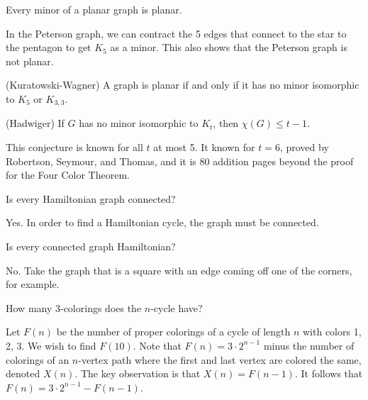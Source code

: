 \documentclass[a4paper]{article}
\begin{document}
\begin{observe}
	Every minor of a planar graph is planar.
\end{observe}

\begin{eg}
	In the Peterson graph, we can contract the 5 edges that connect to the star to the pentagon to get \( K_5 \) as a minor. This also shows that the Peterson graph is not planar.
\end{eg}

\begin{theorem}
	(Kuratowski-Wagner) A graph is planar if and only if it has no minor isomorphic to \( K_5 \) or \( K_{3,3} \).
\end{theorem}

\begin{conjecture}
	(Hadwiger) If \( G \) has no minor isomorphic to \( K_t \), then \( \chi(G) \le t-1 \).
\end{conjecture}

\begin{note}
	This conjecture is known for all \( t \) at most 5. It known for \( t=6 \), proved by Robertson, Seymour, and Thomas, and it is 80 addition pages beyond the proof for the Four Color Theorem.
\end{note}


\begin{eg}
	Is every Hamiltonian graph connected?
\end{eg}

Yes. In order to find a Hamiltonian cycle, the graph must be connected.

\begin{eg}
	Is every connected graph Hamiltonian?
\end{eg}

No. Take the graph that is a square with an edge coming off one of the corners, for example.

\begin{eg}
	How many 3-colorings does the \( n \)-cycle have?
\end{eg}

Let \( F(n) \) be the number of proper colorings of a cycle of length \( n \) with colors 1, 2, 3. We wish to find \( F(10) \). Note that \( F(n) = 3\cdot 2^{n-1}\) minus the number of colorings of an \( n \)-vertex path where the first and last vertex are colored the same, denoted \( X(n) \). The key observation is that \( X(n) = F(n-1) \). It follows that \( F(n) = 3\cdot 2^{n-1}-F(n-1)  \).
\end{document}
